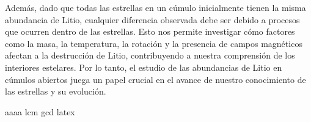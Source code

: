 Además, dado que todas las estrellas en un cúmulo inicialmente tienen la misma abundancia de Litio, cualquier diferencia observada debe ser debido a procesos que ocurren dentro de las estrellas. Esto nos permite investigar cómo factores como la masa, la temperatura, la rotación y la presencia de campos magnéticos afectan a la destrucción de Litio, contribuyendo a nuestra comprensión de los interiores estelares. Por lo tanto, el estudio de las abundancias de Litio en cúmulos abiertos juega un papel crucial en el avance de nuestro conocimiento de las estrellas y su evolución.\par

aaaa \gls{lcm} \acrshort{gcd} \Gls{latex}

\endinput

